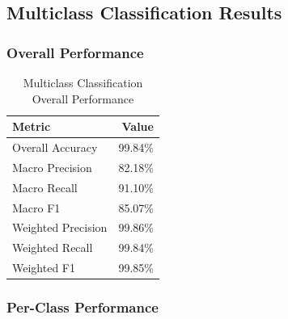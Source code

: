 \documentclass[12pt,a4paper]{article}
\begin{document}
\subsection{Multiclass Classification Results}

\subsubsection{Overall Performance}

\begin{table}[H]
\centering
\caption{Multiclass Classification Overall Performance}
\label{tab:multiclass_overall}
\begin{tabular}{|l|r|}
\hline
\textbf{Metric} & \textbf{Value} \\
\hline
Overall Accuracy & 99.84\% \\
Macro Precision & 82.18\% \\
Macro Recall & 91.10\% \\
Macro F1 & 85.07\% \\
Weighted Precision & 99.86\% \\
Weighted Recall & 99.84\% \\
Weighted F1 & 99.85\% \\
\hline
\end{tabular}
\end{table}

\subsubsection{Per-Class Performance}
\end{document}
